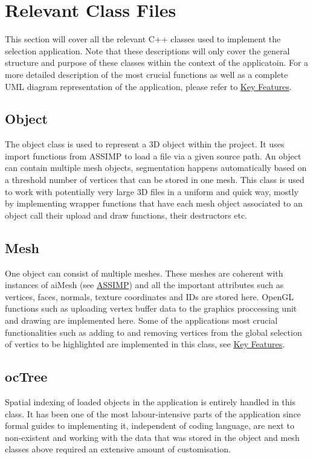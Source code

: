 \section{Relevant Class Files}
\label{sec:relevant_class_files}

This section will cover all the relevant C++ classes used to implement the selection application. Note that these descriptions will only cover the general structure and purpose of these classes within the context of the applicatoin. For a more detailed description of the most crucial functions as well as a complete UML diagram representation of the application, please refer to \hyperref[sec:key_features]{Key Features}.

\subsection{Object}
\label{sec:object}

The object class is used to represent a 3D object within the project. It uses import functions from ASSIMP to load a file via a given source path. An object can contain multiple mesh objects, segmentation happens automatically based on a threshold number of vertices that can be stored in one mesh. This class is used to work with potentially very large 3D files in a uniform and quick way, mostly by implementing wrapper functions that have each mesh object associated to an object call their upload and draw functions, their destructors etc.

\subsection{Mesh}
\label{sec:mesh}

One object can consist of multiple meshes. These meshes are coherent with instances of aiMesh (see \hyperref[sec:assimp]{ASSIMP}) and all the important attributes such as vertices, faces, normals, texture coordinates and IDs are stored here. OpenGL functions such as uploading vertex buffer data to the graphics proccessing unit and drawing are implemented here. Some of the applications most crucial functionalities such as adding to and removing vertices from the global selection of vertics to be highlighted are implemented in this class, see \hyperref[sec:key_features]{Key Features}.

\subsection{ocTree}
\label{sec:octree}
Spatial indexing of loaded objects in the application is entirely handled in this class. It has been one of the most labour-intensive parts of the application since formal guides to implementing it, independent of coding language, are next to non-existent and working with the data that was stored in the object and mesh classes above required an extensive amount of customisation.

